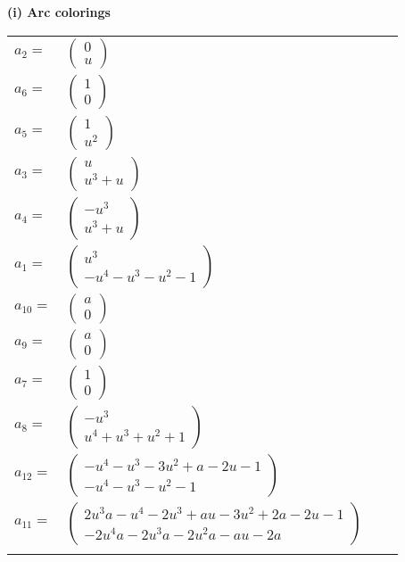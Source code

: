 \documentclass[1p]{elsarticle_modified}
\theoremstyle{definition}
\begin{document}
\flushleft \textbf{(i) Arc colorings}\\
\begin{tabular}{m{7pt} m{180pt} m{7pt} m{180pt} }
\flushright $a_{2}=$&$\begin{pmatrix}0\\u\end{pmatrix}$ \\
\flushright $a_{6}=$&$\begin{pmatrix}1\\0\end{pmatrix}$ \\
\flushright $a_{5}=$&$\begin{pmatrix}1\\u^2\end{pmatrix}$ \\
\flushright $a_{3}=$&$\begin{pmatrix}u\\u^3+u\end{pmatrix}$ \\
\flushright $a_{4}=$&$\begin{pmatrix}- u^3\\u^3+u\end{pmatrix}$ \\
\flushright $a_{1}=$&$\begin{pmatrix}u^3\\- u^4- u^3- u^2-1\end{pmatrix}$ \\
\flushright $a_{10}=$&$\begin{pmatrix}a\\0\end{pmatrix}$ \\
\flushright $a_{9}=$&$\begin{pmatrix}a\\0\end{pmatrix}$ \\
\flushright $a_{7}=$&$\begin{pmatrix}1\\0\end{pmatrix}$ \\
\flushright $a_{8}=$&$\begin{pmatrix}- u^3\\u^4+u^3+u^2+1\end{pmatrix}$ \\
\flushright $a_{12}=$&$\begin{pmatrix}- u^4- u^3-3 u^2+a-2 u-1\\- u^4- u^3- u^2-1\end{pmatrix}$ \\
\flushright $a_{11}=$&$\begin{pmatrix}2 u^3 a- u^4-2 u^3+a u-3 u^2+2 a-2 u-1\\-2 u^4 a-2 u^3 a-2 u^2 a- a u-2 a\end{pmatrix}$\\&\end{tabular}
\end{document}
